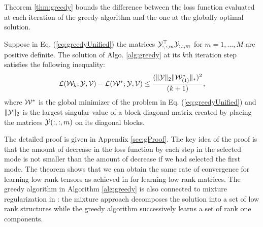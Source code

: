 
Theorem \ref{thm:greedy} bounds the difference between the loss function evaluated at each iteration of the greedy algorithm and the one at the globally optimal solution.

\begin{theorem}\label{thm:greedy}
Suppose in Eq. (\ref{eq:greedyUnified}) the matrices ${\mathcal Y}_{:, :, m}^{\top}{\mathcal Y}_{:, :, m}$ for $m = 1, \ldots, M$ are positive definite.  The solution of Algo. \ref{alg:greedy} at its $k$th iteration step satisfies the following inequality:
\begin{equation}
\mathcal{L}({\mathcal W}_{k};{\mathcal Y},{\mathcal V}) - \mathcal{L}({\mathcal W}^{*};{\mathcal Y},{\mathcal V}) \leq \frac{ (\| {\mathcal Y} \|_{2}\|{\mathcal W}_{(1)}^*\|_{*})^2 }{(k+1)},
\end{equation}
\noindent where ${\mathcal W}^*$ is the global minimizer of the problem in Eq. (\ref{eq:greedyUnified}) and $\| {\mathcal Y}\|_{2}$ is the largest singular value of a block diagonal matrix created by placing the matrices ${\mathcal Y}(:, :, m)$ on its diagonal blocks.
\end{theorem}

The detailed proof is given in Appendix \ref{sec:gProof}. The key idea of the proof is that the amount of decrease in the loss function by each step in the selected mode is not smaller than the amount of decrease if we had selected the first mode. The theorem shows that we can obtain the same rate of convergence for learning low rank tensors as achieved in \cite{ShalevShwartz2010} for learning low rank matrices. The greedy algorithm in Algorithm \ref{alg:greedy} is also connected to mixture regularization in \cite{tomioka2010estimation}: the mixture approach decomposes the solution into a set of low rank structures while the greedy algorithm successively learns a set of rank one components. 

